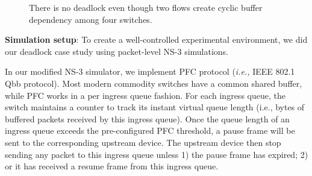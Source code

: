 \begin{figure}[t]
\vspace{-0.15in}
\caption{There is no deadlock even though two flows create cyclic buffer dependency among four switches.}
\label{fig:case1}
\vspace{-0.15in}
\end{figure}

 \textbf{Simulation setup}: To create a well-controlled experimental environment, 
 we did our deadlock case study using packet-level NS-3 simulations. 
 
 In our modified NS-3 simulator, we implement PFC protocol ({\em i.e.,} IEEE 802.1 Qbb protocol). 
 Most modern commodity switches have a common shared buffer, while PFC works in a per ingress 
 queue fashion. For each ingress queue, the switch maintains a counter to 
 track its instant virtual queue length (i.e., bytes of buffered packets received by this 
 ingress queue). Once the queue length of an ingress queue exceeds the pre-configured PFC 
 threshold, a pause frame will be sent to the corresponding upstream device. The upstream 
 device then stop sending any packet to this ingress queue unless 1) the pause frame has 
 expired; 2) or it has received a resume frame from this ingress queue.

